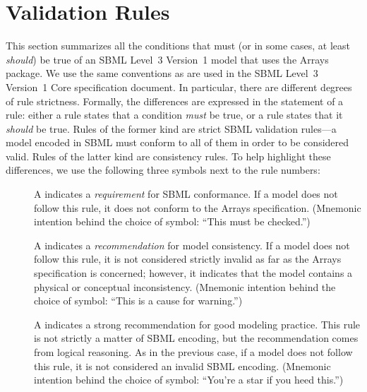 \newcommand{\printValid}{\validRule{arrays-\arabic{arraysCtr}\addtocounter{arraysCtr}{1}}}
\section{Validation Rules}
\label{validation}

This section summarizes all the conditions that must (or in some cases,
at least \emph{should}) be true of an SBML Level~3 Version~1 model that
uses the Arrays package.  We use the same
conventions as are used in the SBML Level~3 Version~1 Core specification
document.  In particular, there are different degrees of rule
strictness.  Formally, the differences are expressed in the statement of
a rule: either a rule states that a condition \emph{must} be true, or a
rule states that it \emph{should} be true.  Rules of the former kind are
strict SBML validation rules---a model encoded in SBML must conform to
all of them in order to be considered valid.  Rules of the latter kind
are consistency rules.  To help highlight these differences, we use the
following three symbols next to the rule numbers:

\begin{description}

\item[\hspace*{6.5pt}\vSymbol\vsp] A \vSymbolName indicates a
  \emph{requirement} for SBML conformance. If a model does not follow
  this rule, it does not conform to the Arrays
  specification.  (Mnemonic intention behind the choice of symbol:
  ``This must be checked.'')

\item[\hspace*{6.5pt}\cSymbol\csp] A \cSymbolName indicates a
  \emph{recommendation} for model consistency.  If a model does not
  follow this rule, it is not considered strictly invalid as far as the
  Arrays specification is concerned; however, it
  indicates that the model contains a physical or conceptual
  inconsistency.  (Mnemonic intention behind the choice of symbol:
  ``This is a cause for warning.'')

\item[\hspace*{6.5pt}\mSymbol\msp] A \mSymbolName indicates a strong
  recommendation for good modeling practice.  This rule is not strictly
  a matter of SBML encoding, but the recommendation comes from logical
  reasoning.  As in the previous case, if a model does not follow this
  rule, it is not considered an invalid SBML encoding.  (Mnemonic
  intention behind the choice of symbol: ``You're a star if you heed
  this.'')

\end{description}

